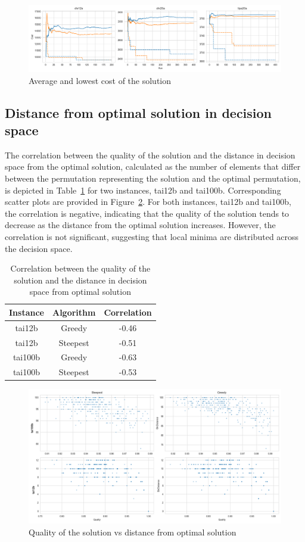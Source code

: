 \begin{figure}[H]
    \centering
    \includegraphics[width=1.0\textwidth]{pics/initial_quality_cost_so_far}
    \caption{Average and lowest cost of the solution}
    \label{fig:4}
\end{figure}

\subsection{Distance from optimal solution in decision space}\label{subsec:distance-from-optimal-solution-in-decision-space}
The correlation between the quality of the solution and the distance in decision space from the optimal solution,
calculated as the number of elements that differ between the permutation representing the solution and the optimal permutation,
is depicted in Table~\ref{tab:1} for two instances, tai12b and tai100b.
Corresponding scatter plots are provided in Figure~\ref{fig:5}.
For both instances, tai12b and tai100b, the correlation is negative,
indicating that the quality of the solution tends to decrease as the distance from the optimal solution increases.
However, the correlation is not significant, suggesting that local minima are distributed across the decision space.

\begin{table}[H]
    \centering
    \begin{tabular}{|c|c|c|}
        \hline
        Instance & Algorithm & Correlation \\
        \hline
        tai12b & Greedy & -0.46 \\
        tai12b & Steepest & -0.51 \\
        tai100b & Greedy & -0.63 \\
        tai100b & Steepest & -0.53 \\
        \hline
    \end{tabular}
    \caption{Correlation between the quality of the solution and the distance in decision space from optimal solution}
    \label{tab:1}
\end{table}

\begin{figure}[H]
    \centering
    \includegraphics[width=1.0\textwidth]{pics/repetitions_quality_distance_scatter}
    \caption{Quality of the solution vs distance from optimal solution}
    \label{fig:5}
\end{figure}